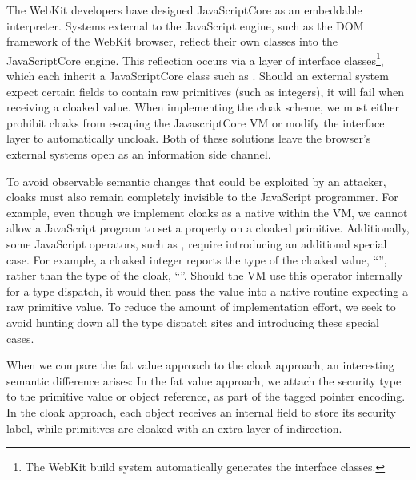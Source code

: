 The WebKit developers have designed JavaScriptCore as an embeddable interpreter.
Systems external to the JavaScript engine, such as the DOM framework of the WebKit browser, reflect their own classes into the JavaScriptCore engine.
This reflection occurs via a layer of interface classes\footnote{The WebKit build system automatically generates the interface classes.}, which each inherit a JavaScriptCore class such as .
Should an external system expect certain fields to contain raw primitives (such as integers), it will fail when receiving a cloaked value.
When implementing the cloak scheme, we must either prohibit cloaks from escaping the JavascriptCore VM or modify the interface layer to automatically uncloak.
Both of these solutions leave the browser's external systems open as an information side channel.

To avoid observable semantic changes that could be exploited by an attacker, cloaks must also remain completely invisible to the JavaScript programmer.
For example, even though we implement cloaks as a native  within the VM, we cannot allow a JavaScript program to set a property on a cloaked primitive.
Additionally, some JavaScript operators, such as , require introducing an additional special case.
For example, a cloaked integer reports the type of the cloaked value, ``'', rather than the type of the cloak, ``''.
Should the VM use this operator internally for a type dispatch, it would then pass the value into a native routine expecting a raw primitive value.
To reduce the amount of implementation effort, we seek to avoid hunting down all the type dispatch sites and introducing these special cases.

When we compare the fat value approach to the cloak approach, an interesting semantic difference arises:
In the fat value approach, we attach the security type to the primitive value or object reference, as part of the tagged pointer encoding.
In the cloak approach, each object receives an internal field to store its security label, while primitives are cloaked with an extra layer of indirection.


